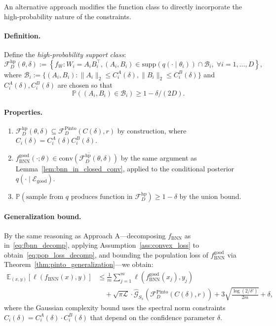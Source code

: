 \documentclass{article}
\theoremstyle{plain}
\theoremstyle{definition}
\theoremstyle{remark}
\begin{document}
An alternative approach modifies the function class to directly incorporate the high-probability nature of the constraints.

\paragraph{Definition.} Define the \emph{high-probability support class}:
\begin{equation}
    \mathcal{F}_D^{\mathrm{hp}}(\theta, \delta) := \left\{ f_W : W_i = A_i B_i^\top, (A_i, B_i) \in \mathrm{supp}(q(\cdot\mid\theta_i)) \cap \mathcal{B}_i,\; \forall i=1,\ldots,D \right\},
\end{equation}
where $\mathcal{B}_i := \{(A_i, B_i) : \|A_i\|_2 \leq C_i^A(\delta), \|B_i\|_2 \leq C_i^B(\delta)\}$ and $C_i^A(\delta), C_i^B(\delta)$ are chosen so that 
\begin{equation}
\mathbb{P}((A_i, B_i) \in \mathcal{B}_i) \geq 1 - \delta/(2D).
\end{equation}

\paragraph{Properties.}
\begin{enumerate}
    \item $\mathcal{F}_D^{\mathrm{hp}}(\theta, \delta) \subseteq \mathcal{F}_D^{\mathrm{Pinto}}(C(\delta),r)$ by construction, where $C_i(\delta) = C_i^A(\delta) C_i^B(\delta)$.
    
    \item $f_{\mathrm{BNN}}^{\mathrm{good}}(\cdot;\theta) \in \overline{\mathrm{conv}(\mathcal{F}_D^{\mathrm{hp}}(\theta, \delta))}$ by the same argument as Lemma~\ref{lem:bnn_in_closed_conv}, applied to the conditional posterior $q(\cdot \mid \mathcal{E}_{\text{good}})$.
    
    \item $\mathbb{P}(\text{sample from } q \text{ produces function in } \mathcal{F}_D^{\mathrm{hp}}) \geq 1 - \delta$ by the union bound.
\end{enumerate}

\paragraph{Generalization bound.} By the same reasoning as Approach A---decomposing $f_{\mathrm{BNN}}$ as in~\eqref{eq:fbnn_decomp}, applying Assumption~\ref{ass:convex_loss} to obtain~\eqref{eq:pop_loss_decomp}, and bounding the population loss of $f_{\mathrm{BNN}}^{\mathrm{good}}$ via Theorem~\ref{thm:pinto_generalization}---we obtain:
\begin{align}
    \mathbb{E}_{(x,y)}[\ell(f_{\mathrm{BNN}}(x), y)] 
    &\leq \frac{1}{m}\sum_{j=1}^{m} \ell(f_{\mathrm{BNN}}^{\mathrm{good}}(x_j), y_j) \nonumber \\
    &\quad + \sqrt{\pi \mathcal{L}} \cdot \hat{\mathcal{G}}_{S_x}(\mathcal{F}_D^{\mathrm{Pinto}}(C(\delta),r)) + 3\sqrt{\frac{\log(2/\delta')}{2m}} + \delta,
\end{align}
where the Gaussian complexity bound uses the spectral norm constraints $C_i(\delta) = C_i^A(\delta) \cdot C_i^B(\delta)$ that depend on the confidence parameter $\delta$.
\end{document}

